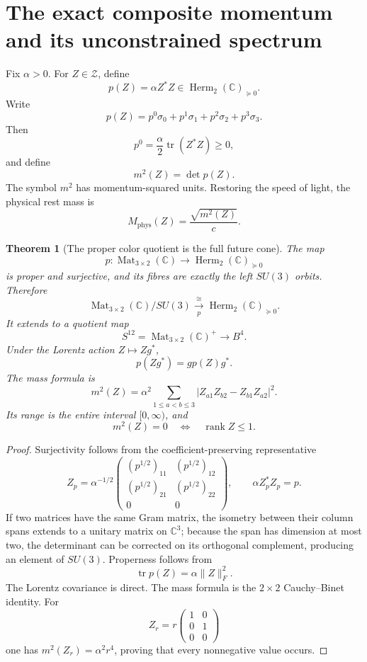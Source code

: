 \documentclass[11pt]{article}
\newtheorem{theorem}{Theorem}[section]
\theoremstyle{definition}
\newcommand{\C}{\mathbb C}
\newcommand{\Herm}{\operatorname{Herm}}
\newcommand{\Mat}{\operatorname{Mat}}
\newcommand{\tr}{\operatorname{tr}}
\newcommand{\rank}{\operatorname{rank}}
\newcommand{\cZ}{\mathscr Z}
\begin{document}
\section{The exact composite momentum and its unconstrained spectrum}

Fix $\alpha>0$.  For $Z\in\cZ$, define
\[
 \boxed{p(Z)=\alpha Z^*Z\in\Herm_2(\C)_{\succeq0}.}
\]
Write
\[
 p(Z)=p^0\sigma_0+p^1\sigma_1+p^2\sigma_2+p^3\sigma_3.
\]
Then
\[
 p^0=\frac{\alpha}{2}\tr(Z^*Z)\geq0,
\]
and define
\[
 \boxed{m^2(Z)=\det p(Z).}
\]
The symbol $m^2$ has momentum-squared units.  Restoring the speed of light, the physical rest mass is
\[
 M_{\mathrm{phys}}(Z)=\frac{\sqrt{m^2(Z)}}{c}.
\]

\begin{theorem}[The proper color quotient is the full future cone]\label{thm:momentum-quotient}
The map
\[
 p:\Mat_{3\times2}(\C)\longrightarrow\Herm_2(\C)_{\succeq0}
\]
is proper and surjective, and its fibres are exactly the left $SU(3)$ orbits.  Therefore
\[
 \boxed{
 \Mat_{3\times2}(\C)/SU(3)
 \xrightarrow[\ p\ ]{\cong}
 \Herm_2(\C)_{\succeq0}.}
\]
It extends to a quotient map
\[
 S^{12}=\Mat_{3\times2}(\C)^+\longrightarrow B^4.
\]
Under the Lorentz action $Z\mapsto Zg^*$,
\[
 \boxed{p(Zg^*)=gp(Z)g^*.}
\]
The mass formula is
\[
 \boxed{
 m^2(Z)=\alpha^2\sum_{1\leq a<b\leq3}
 |Z_{a1}Z_{b2}-Z_{b1}Z_{a2}|^2.}
\]
Its range is the entire interval $[0,\infty)$, and
\[
 m^2(Z)=0\quad\Longleftrightarrow\quad\rank Z\leq1.
\]
\end{theorem}

\begin{proof}
Surjectivity follows from the coefficient-preserving representative
\[
 Z_p=\alpha^{-1/2}
 \begin{pmatrix}
 (p^{1/2})_{11}&(p^{1/2})_{12}\\
 (p^{1/2})_{21}&(p^{1/2})_{22}\\
 0&0
 \end{pmatrix},
 \qquad \alpha Z_p^*Z_p=p.
\]
If two matrices have the same Gram matrix, the isometry between their column spans extends to a unitary matrix on $\C^3$; because the span has dimension at most two, the determinant can be corrected on its orthogonal complement, producing an element of $SU(3)$.  Properness follows from
\[
 \tr p(Z)=\alpha\|Z\|_F^2.
\]
The Lorentz covariance is direct.  The mass formula is the $2\times2$ Cauchy--Binet identity.  For
\[
 Z_r=r\begin{pmatrix}1&0\\0&1\\0&0\end{pmatrix}
\]
one has $m^2(Z_r)=\alpha^2r^4$, proving that every nonnegative value occurs.
\end{proof}
\end{document}
